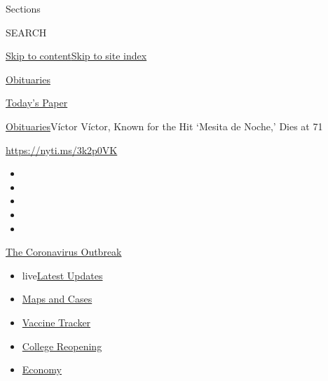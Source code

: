Sections

SEARCH

\protect\hyperlink{site-content}{Skip to
content}\protect\hyperlink{site-index}{Skip to site index}

\href{https://www.nytimes.com/section/obituaries}{Obituaries}

\href{https://myaccount.nytimes.com/auth/login?response_type=cookie\&client_id=vi}{}

\href{https://www.nytimes.com/section/todayspaper}{Today's Paper}

\href{/section/obituaries}{Obituaries}\textbar{}Víctor Víctor, Known for
the Hit `Mesita de Noche,' Dies at 71

\url{https://nyti.ms/3k2p0VK}

\begin{itemize}
\item
\item
\item
\item
\item
\end{itemize}

\href{https://www.nytimes.com/news-event/coronavirus?action=click\&pgtype=Article\&state=default\&region=TOP_BANNER\&context=storylines_menu}{The
Coronavirus Outbreak}

\begin{itemize}
\tightlist
\item
  live\href{https://www.nytimes.com/2020/08/03/world/coronavirus-covid-19.html?action=click\&pgtype=Article\&state=default\&region=TOP_BANNER\&context=storylines_menu}{Latest
  Updates}
\item
  \href{https://www.nytimes.com/interactive/2020/us/coronavirus-us-cases.html?action=click\&pgtype=Article\&state=default\&region=TOP_BANNER\&context=storylines_menu}{Maps
  and Cases}
\item
  \href{https://www.nytimes.com/interactive/2020/science/coronavirus-vaccine-tracker.html?action=click\&pgtype=Article\&state=default\&region=TOP_BANNER\&context=storylines_menu}{Vaccine
  Tracker}
\item
  \href{https://www.nytimes.com/2020/08/02/us/covid-college-reopening.html?action=click\&pgtype=Article\&state=default\&region=TOP_BANNER\&context=storylines_menu}{College
  Reopening}
\item
  \href{https://www.nytimes.com/live/2020/08/03/business/stock-market-today-coronavirus?action=click\&pgtype=Article\&state=default\&region=TOP_BANNER\&context=storylines_menu}{Economy}
\end{itemize}

